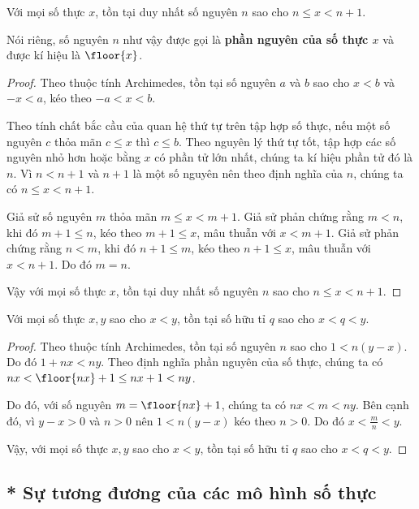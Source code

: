 \begin{theorem}
    Với mọi số thực $x$, tồn tại duy nhất số nguyên $n$ sao cho $n\leq x < n+1$.

    \noindent Nói riêng, số nguyên $n$ như vậy được gọi là \textbf{phần nguyên của số thực $x$} và được kí hiệu là $\floor{x}$.
\end{theorem}

\begin{proof}
    Theo thuộc tính Archimedes, tồn tại số nguyên $a$ và $b$ sao cho $x < b$ và $-x < a$, kéo theo $-a < x < b$.

    Theo tính chất bắc cầu của quan hệ thứ tự trên tập hợp số thực, nếu một số nguyên $c$ thỏa mãn $c\leq x$ thì $c\leq b$. Theo nguyên lý thứ tự tốt, tập hợp các số nguyên nhỏ hơn hoặc bằng $x$ có phần tử lớn nhất, chúng ta kí hiệu phần tử đó là $n$. Vì $n < n + 1$ và $n + 1$ là một số nguyên nên theo định nghĩa của $n$, chúng ta có $n\leq x < n + 1$.

    Giả sử số nguyên $m$ thỏa mãn $m\leq x < m + 1$. Giả sử phản chứng rằng $m < n$, khi đó $m + 1\leq n$, kéo theo $m + 1\leq x$, mâu thuẫn với $x < m + 1$. Giả sử phản chứng rằng $n < m$, khi đó $n + 1\leq m$, kéo theo $n + 1\leq x$, mâu thuẫn với $x < n + 1$. Do đó $m = n$.

    Vậy với mọi số thực $x$, tồn tại duy nhất số nguyên $n$ sao cho $n\leq x < n+1$.
\end{proof}

\begin{theorem}
    Với mọi số thực $x, y$ sao cho $x < y$, tồn tại số hữu tỉ $q$ sao cho $x < q < y$.
\end{theorem}

\begin{proof}
    Theo thuộc tính Archimedes, tồn tại số nguyên $n$ sao cho $1 < n(y - x)$. Do đó $1 + nx < ny$. Theo định nghĩa phần nguyên của số thực, chúng ta có $nx < \floor{nx} + 1 \leq nx + 1 < ny$.

    Do đó, với số nguyên $m = \floor{nx} + 1$, chúng ta có $nx < m < ny$. Bên cạnh đó, vì $y - x > 0$ và $n > 0$ nên  $1 < n(y - x)$ kéo theo $n > 0$. Do đó $x < \frac{m}{n} < y$.

    Vậy, với mọi số thực $x, y$ sao cho $x < y$, tồn tại số hữu tỉ $q$ sao cho $x < q < y$.
\end{proof}

\subsection{* Sự tương đương của các mô hình số thực}

